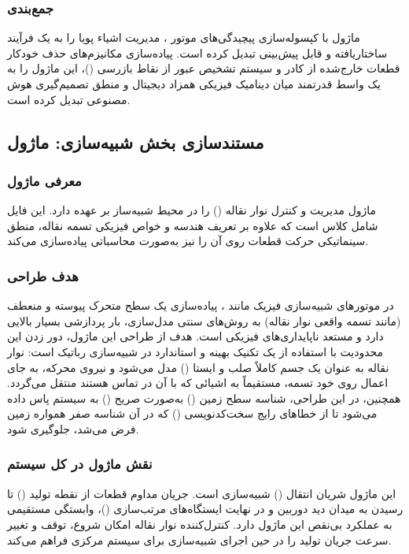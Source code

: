 \documentclass{article}
\begin{document}
\subsubsection{جمع‌بندی}
ماژول  با کپسوله‌سازی پیچیدگی‌های موتور ، مدیریت اشیاء پویا را به یک فرآیند ساختاریافته و قابل پیش‌بینی تبدیل کرده است. پیاده‌سازی مکانیزم‌های حذف خودکار قطعات خارج‌شده از کادر و سیستم تشخیص عبور از نقاط بازرسی ()، این ماژول را به یک واسط قدرتمند میان دینامیک فیزیکی همزاد دیجیتال و منطق تصمیم‌گیری هوش مصنوعی تبدیل کرده است.


\subsection{مستندسازی بخش شبیه‌سازی: ماژول }

\subsubsection{معرفی ماژول}
ماژول  مدیریت و کنترل نوار نقاله () را در محیط شبیه‌ساز بر عهده دارد. این فایل شامل کلاس  است که علاوه بر تعریف هندسه و خواص فیزیکی تسمه نقاله، منطق سینماتیکی حرکت قطعات روی آن را نیز به‌صورت محاسباتی پیاده‌سازی می‌کند.

\subsubsection{هدف طراحی}
در موتورهای شبیه‌سازی فیزیک مانند ، پیاده‌سازی یک سطح متحرک پیوسته و منعطف (مانند تسمه واقعی نوار نقاله) به روش‌های سنتی مدل‌سازی، بار پردازشی بسیار بالایی دارد و مستعد ناپایداری‌های فیزیکی است. هدف از طراحی این ماژول، دور زدن این محدودیت با استفاده از یک تکنیک بهینه و استاندارد در شبیه‌سازی رباتیک است: نوار نقاله به عنوان یک جسم کاملاً صلب و ایستا () مدل می‌شود و نیروی محرکه، به جای اعمال روی خود تسمه، مستقیماً به اشیائی که با آن در تماس هستند منتقل می‌گردد.
همچنین، در این طراحی، شناسه سطح زمین () به‌صورت صریح () به سیستم پاس داده می‌شود تا از خطاهای رایج سخت‌کدنویسی () که در آن شناسه صفر همواره زمین فرض می‌شد، جلوگیری شود.

\subsubsection{نقش ماژول در کل سیستم}
این ماژول شریان انتقال () شبیه‌سازی است. جریان مداوم قطعات از نقطه تولید () تا رسیدن به میدان دید دوربین و در نهایت ایستگاه‌های مرتب‌سازی ()، وابستگی مستقیمی به عملکرد بی‌نقص این ماژول دارد. کنترل‌کننده نوار نقاله امکان شروع، توقف و تغییر سرعت جریان تولید را در حین اجرای شبیه‌سازی برای سیستم مرکزی فراهم می‌کند.
\end{document}

